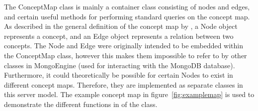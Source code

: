 The ConceptMap class is mainly a container class consisting of nodes and edges, and certain useful methods for performing standard queries on the concept map. As described in the general definition of the concept map by , a Node object represents a concept, and an Edge object represents a relation between two concepts. The Node and Edge were originally intended to be embedded within the ConceptMap class, however this makes them impossible to refer to by other classes in MongoEngine (used for interacting with the MongoDB database). Furthermore, it could theoretically be possible for certain Nodes to exist in different concept maps. Therefore, they are implemented as separate classes in this server model. The example concept map in figure~\ref{fig:examplemap} is used to demonstrate the different functions in of the class.

